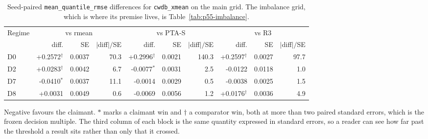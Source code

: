 \begin{table}[htbp]
\centering
\caption{Seed-paired \texttt{mean\_quantile\_rmse} differences for \texttt{cwdb\_xmean} on the main grid. The imbalance grid, which is where its premise lives, is Table~\ref{tab:p55-imbalance}.}
\label{tab:p55-paired-xmean}
\scriptsize
\setlength{\tabcolsep}{4pt}
\begin{tabular}{@{}lrrrrrrrrr@{}}
\toprule
Regime & \multicolumn{3}{c}{vs rmean} & \multicolumn{3}{c}{vs PTA-S} & \multicolumn{3}{c}{vs R3} \\
  & diff. & SE & $|$diff$|/$SE & diff. & SE & $|$diff$|/$SE & diff. & SE & $|$diff$|/$SE \\
\midrule
D0 & +0.2572$^{\dagger}$ & 0.0037 & 70.3 & +0.2996$^{\dagger}$ & 0.0021 & 140.3 & +0.2597$^{\dagger}$ & 0.0027 & 97.7 \\
D2 & +0.0283$^{\dagger}$ & 0.0042 & 6.7 & -0.0077$^{\ast}$ & 0.0031 & 2.5 & -0.0122 & 0.0118 & 1.0 \\
D7 & -0.0410$^{\ast}$ & 0.0037 & 11.1 & -0.0014 & 0.0029 & 0.5 & -0.0038 & 0.0025 & 1.5 \\
D8 & +0.0031 & 0.0049 & 0.6 & -0.0069 & 0.0056 & 1.2 & +0.0176$^{\dagger}$ & 0.0036 & 4.9 \\
\bottomrule
\end{tabular}
\par\vspace{2pt}\parbox{0.96\textwidth}{\scriptsize Negative favours the claimant. $\ast$ marks a claimant win and $\dagger$ a comparator win, both at more than two paired standard errors, which is the frozen decision multiple. The third column of each block is the same quantity expressed in standard errors, so a reader can see how far past the threshold a result sits rather than only that it crossed.}
\end{table}

